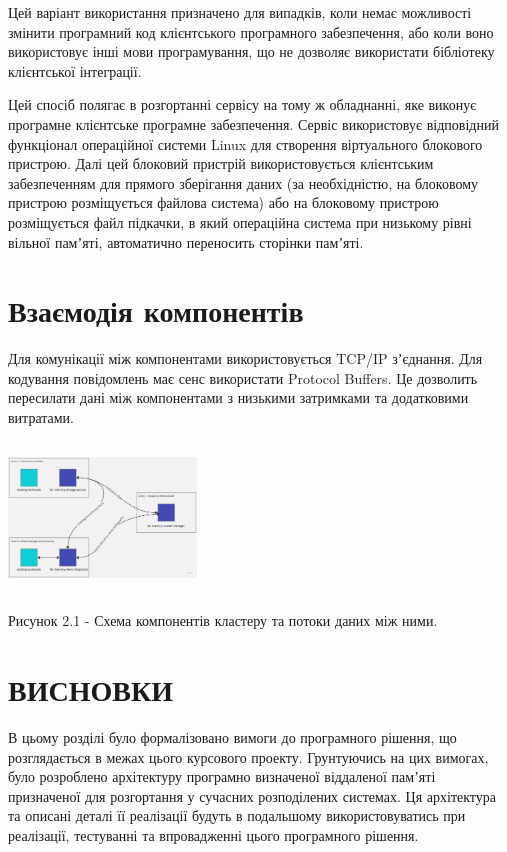 \documentclass[14pt]{article}
\begin{document}
Цей варіант використання призначено для випадків, коли немає можливості змінити програмний код клієнтського програмного забезпечення, або коли воно використовує інші мови програмування, що не дозволяє використати бібліотеку клієнтської інтеграції.

Цей спосіб полягає в розгортанні сервісу на тому ж обладнанні, яке виконує програмне клієнтське програмне забезпечення. Сервіс використовує відповідний функціонал операційної системи Linux для створення віртуального блокового пристрою. Далі цей блоковий пристрій використовується клієнтським забезпеченням для прямого зберігання даних (за необхідністю, на блоковому пристрою розміщується файлова система) або на блоковому пристрою розміщується файл підкачки, в який операційна система при низькому рівні вільної памʼяті, автоматично переносить сторінки памʼяті.

\section {Взаємодія компонентів}

Для комунікації між компонентами використовується TCP/IP зʼєднання. Для кодування повідомлень має сенс використати Protocol Buffers. Це дозволить пересилати дані між компонентами з низькими затримками та додатковими витратами.

\includegraphics[width=5cm, height=4cm]{image2.jpg}

Рисунок 2.1 - Схема компонентів кластеру та потоки даних між ними.

\section{ВИСНОВКИ}

В цьому розділі було формалізовано вимоги до програмного рішення, що розглядається в межах цього курсового проекту. Грунтуючись на цих вимогах, було розроблено архітектуру програмно визначеної віддаленої памʼяті призначеної для розгортання у сучасних розподілених системах. Ця архітектура та описані деталі її реалізації будуть в подальшому використовуватись при реалізації, тестуванні та впровадженні цього програмного рішення.
\end{document}
